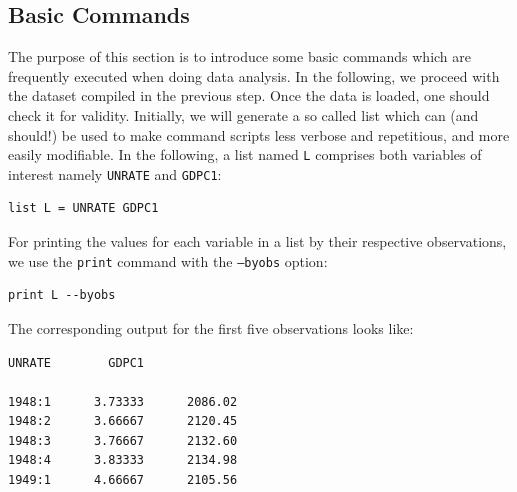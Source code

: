 \documentclass[11pt]{article}
\begin{document}


\subsection{Basic Commands}
The purpose of this section is to introduce some basic commands which are frequently executed when doing data analysis. In the following, we proceed with the dataset compiled in the previous step. Once the data is loaded, one should check it for validity. %
Initially, we will generate a so called list which can (and should!) be used to make command scripts less verbose and repetitious, and more easily modifiable. In the following, a list named \texttt{L} comprises both variables of interest namely \texttt{UNRATE} and \texttt{GDPC1}:
\begin{Verbatim}[baselinestretch=0.75, fontsize=\small]
list L = UNRATE GDPC1
\end{Verbatim}

For printing the values for each variable in a list by their respective observations, we use the \texttt{print} command with the \texttt{---byobs} option:
\begin{Verbatim}[baselinestretch=0.75, fontsize=\small]
print L --byobs
\end{Verbatim}
The corresponding output for the first five observations looks like:
\begin{Verbatim}[baselinestretch=0.75, fontsize=\small]
             UNRATE        GDPC1

1948:1      3.73333      2086.02
1948:2      3.66667      2120.45
1948:3      3.76667      2132.60
1948:4      3.83333      2134.98
1949:1      4.66667      2105.56
\end{Verbatim}
\end{document}
